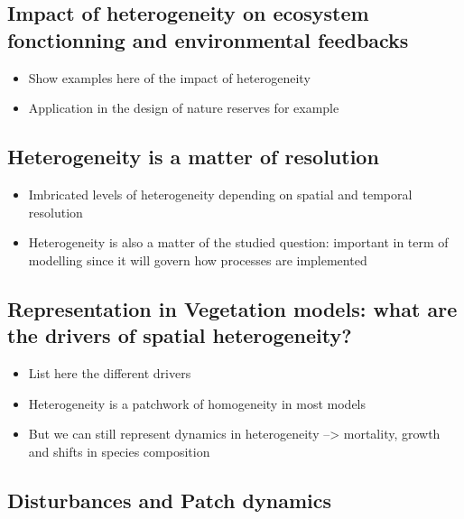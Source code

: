 \documentclass[oneside]{book}
\providecommand{\tightlist}{%
  \setlength{\itemsep}{0pt}\setlength{\parskip}{0pt}}
\begin{document}
\subsection{Impact of heterogeneity on ecosystem fonctionning and
environmental
feedbacks}\label{impact-of-heterogeneity-on-ecosystem-fonctionning-and-environmental-feedbacks}

\begin{itemize}
\tightlist
\item
  Show examples here of the impact of heterogeneity
\item
  Application in the design of nature reserves for example
\end{itemize}

\subsection{Heterogeneity is a matter of
resolution}\label{heterogeneity-is-a-matter-of-resolution}

\begin{itemize}
\tightlist
\item
  Imbricated levels of heterogeneity depending on spatial and temporal
  resolution
\item
  Heterogeneity is also a matter of the studied question: important in
  term of modelling since it will govern how processes are implemented
\end{itemize}

\subsection{Representation in Vegetation models: what are the drivers of
spatial
heterogeneity?}\label{representation-in-vegetation-models-what-are-the-drivers-of-spatial-heterogeneity}

\begin{itemize}
\tightlist
\item
  List here the different drivers
\item
  Heterogeneity is a patchwork of homogeneity in most models
\item
  But we can still represent dynamics in heterogeneity --\textgreater{}
  mortality, growth and shifts in species composition
\end{itemize}

\subsection{Disturbances and Patch
dynamics}\label{disturbances-and-patch-dynamics}
\end{document}
